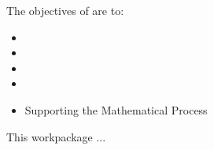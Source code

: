 \addtocounter{wpno}{1}
\begin{Workpackage}{\thewpno}
\WPTitle{\wpname{\thewpno}}


\begin{WPObjectives}
The objectives of \theWP{} are to:
\begin{itemize}
\item
\item
\item
\item
\item Supporting the Mathematical Process
\end{itemize}
\end{WPObjectives}

\begin{WPDescription}
This workpackage  ...
\end{WPDescription}


\begin{WPDeliverables}
\end{WPDeliverables}
\end{Workpackage}
